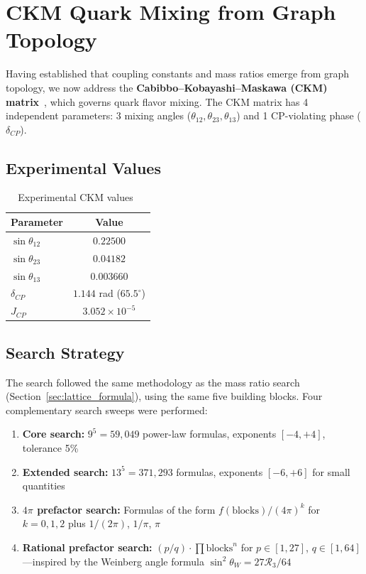 \section{CKM Quark Mixing from Graph Topology}\label{sec:ckm_mixing}

Having established that coupling constants and mass ratios emerge from graph topology, we now address the \textbf{Cabibbo--Kobayashi--Maskawa (CKM) matrix}~\cite{cabibbo1963,ckm1973}, which governs quark flavor mixing. The CKM matrix has 4 independent parameters: 3 mixing angles ($\theta_{12}, \theta_{23}, \theta_{13}$) and 1 CP-violating phase ($\delta_{CP}$).

\subsection{Experimental Values}\label{sec:ckm_experimental}

\begin{table}[h]
\centering
\caption{Experimental CKM values~\cite{pdg2024}}
\label{tab:ckm_experimental}
\begin{tabular}{lc}
\hline\hline
Parameter & Value \\
\hline
$\sin\theta_{12}$ & $0.22500$ \\
$\sin\theta_{23}$ & $0.04182$ \\
$\sin\theta_{13}$ & $0.003660$ \\
$\delta_{CP}$ & $1.144$ rad ($65.5^\circ$) \\
$J_{CP}$ & $3.052 \times 10^{-5}$ \\
\hline\hline
\end{tabular}
\end{table}

\subsection{Search Strategy}\label{sec:ckm_search}

The search followed the same methodology as the mass ratio search (Section~\ref{sec:lattice_formula}), using the same five building blocks. Four complementary search sweeps were performed:

\begin{enumerate}
\item \textbf{Core search:} $9^5 = 59{,}049$ power-law formulas, exponents $[-4, +4]$, tolerance 5\%
\item \textbf{Extended search:} $13^5 = 371{,}293$ formulas, exponents $[-6, +6]$ for small quantities
\item \textbf{$4\pi$ prefactor search:} Formulas of the form $f(\mathrm{blocks})/(4\pi)^k$ for $k = 0, 1, 2$ plus $1/(2\pi)$, $1/\pi$, $\pi$
\item \textbf{Rational prefactor search:} $(p/q) \cdot \prod \mathrm{blocks}^n$ for $p \in [1, 27]$, $q \in [1, 64]$---inspired by the Weinberg angle formula $\sin^2\theta_W = 27\mathcal{R}_3/64$
\end{enumerate}

